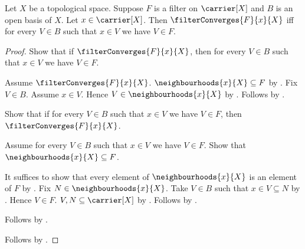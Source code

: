 \begin{theorem}\label{filter_converges_iff_open_basis_members}
    Let $X$ be a topological space.
    Suppose $F$ is a filter on $\carrier[X]$ and
        $B$ is an open basis of $X$.
    Let $x\in\carrier[X]$.
    Then $\filterConverges{F}{x}{X}$ iff
        for every $V\in B$ such that $x\in V$ we have $V\in F$.
\end{theorem}
\begin{proof}
    Show that if $\filterConverges{F}{x}{X}$, then
        for every $V\in B$ such that $x\in V$ we have $V\in F$.
    \begin{subproof}
        Assume $\filterConverges{F}{x}{X}$.
        $\neighbourhoods{x}{X}\subseteq F$ by
            .
        Fix $V\in B$.
        Assume $x\in V$.
        Hence $V\in\neighbourhoods{x}{X}$ by
            .
        Follows by .
    \end{subproof}
    Show that if for every $V\in B$ such that $x\in V$ we have
        $V\in F$, then $\filterConverges{F}{x}{X}$.
    \begin{subproof}
        Assume for every $V\in B$ such that $x\in V$ we have
            $V\in F$.
        Show that $\neighbourhoods{x}{X}\subseteq F$.
        \begin{subproof}
            It suffices to show that every element of
                $\neighbourhoods{x}{X}$ is an element of $F$ by
                .
            Fix $N\in\neighbourhoods{x}{X}$.
            Take $V\in B$ such that $x\in V\subseteq N$ by
                .
            Hence $V\in F$.
            $V,N\subseteq\carrier[X]$ by
                .
            Follows by .
        \end{subproof}
        Follows by .
    \end{subproof}
    Follows by \auto.
\end{proof}

